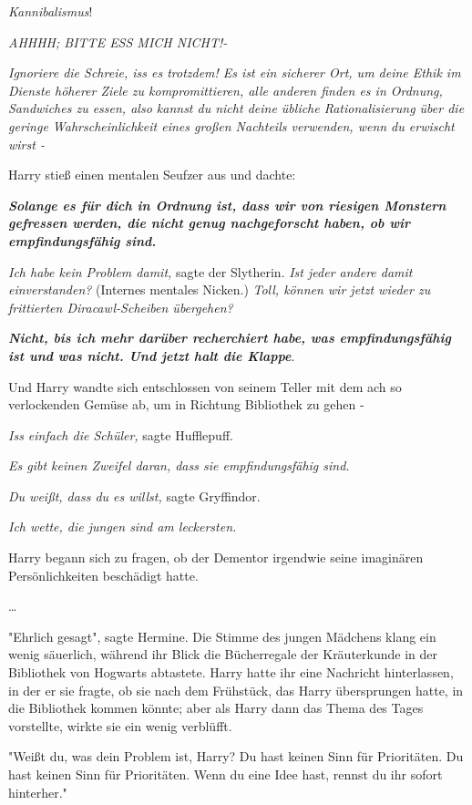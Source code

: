 {\emph{Kannibalismus}!

\emph{AHHHH; BITTE ESS MICH NICHT!-}

\emph{Ignoriere die Schreie, iss es trotzdem! Es ist ein sicherer Ort, um deine Ethik im Dienste höherer Ziele zu kompromittieren, alle anderen finden es in Ordnung, Sandwiches zu essen, also kannst du nicht deine übliche Rationalisierung über die geringe Wahrscheinlichkeit eines großen Nachteils verwenden, wenn du erwischt wirst -}

Harry stieß einen mentalen Seufzer aus und dachte:

\textbf{\emph{Solange es für dich in Ordnung ist, dass wir von riesigen Monstern gefressen werden, die nicht genug nachgeforscht haben, ob wir empfindungsfähig sind.}}

\emph{Ich habe kein Problem damit,} sagte der Slytherin. \emph{Ist jeder andere damit einverstanden?} (Internes mentales Nicken.) \emph{Toll, können wir jetzt wieder zu frittierten Diracawl-Scheiben übergehen?}

\textbf{\emph{Nicht, bis ich mehr darüber recherchiert habe, was empfindungsfähig ist und was nicht. Und jetzt halt die Klappe}}.

Und Harry wandte sich entschlossen von seinem Teller mit dem ach so verlockenden Gemüse ab, um in Richtung Bibliothek zu gehen -

\emph{Iss einfach die Schüler,} sagte Hufflepuff.

\emph{Es gibt keinen Zweifel daran, dass sie empfindungsfähig sind.}

\emph{Du weißt, dass du es willst,} sagte Gryffindor.

\emph{Ich wette, die jungen sind am leckersten.}

Harry begann sich zu fragen, ob der Dementor irgendwie seine imaginären Persönlichkeiten beschädigt hatte.

…

"Ehrlich gesagt", sagte Hermine. Die Stimme des jungen Mädchens klang ein wenig säuerlich, während ihr Blick die Bücherregale der Kräuterkunde in der Bibliothek von Hogwarts abtastete. Harry hatte ihr eine Nachricht hinterlassen, in der er sie fragte, ob sie nach dem Frühstück, das Harry übersprungen hatte, in die Bibliothek kommen könnte; aber als Harry dann das Thema des Tages vorstellte, wirkte sie ein wenig verblüfft.

"Weißt du, was dein Problem ist, Harry? Du hast keinen Sinn für Prioritäten. Du hast keinen Sinn für Prioritäten. Wenn du eine Idee hast, rennst du ihr sofort hinterher."

}
